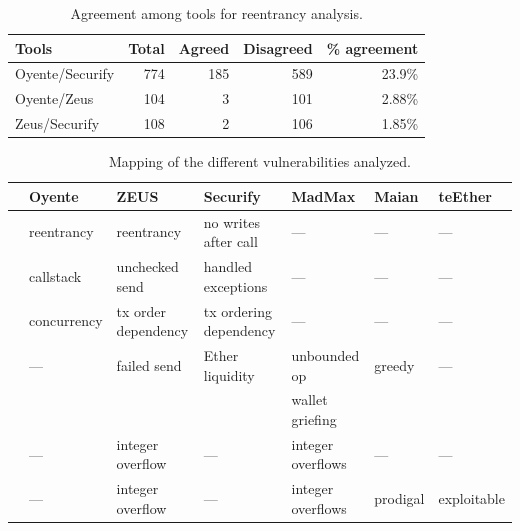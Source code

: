 \begin{table}[tb]
	\setlength{\tabcolsep}{2pt}
	\centering
	\caption{Agreement among tools for reentrancy analysis.}
	\label{fig:reentrancy-agreement}
	\begin{tabular}{lrrrr}
		\toprule
		\bf Tools       & \bf Total & \bf Agreed & \bf Disagreed & \bf \% agreement \\
		\midrule
		Oyente/Securify & 774       & 185        & 589           & 23.9\%           \\
		Oyente/Zeus     & 104       & 3          & 101           & 2.88\%           \\
		Zeus/Securify   & 108       & 2          & 106           & 1.85\%           \\
		\bottomrule
	\end{tabular}
\end{table}

\begin{table}
	\centering
	\setlength{\tabcolsep}{2pt}
	\small
	\caption{Mapping of the different vulnerabilities analyzed.}
	\label{fig:vuln-mapping}
	\begin{tabular}{lllllll}
		\toprule
		         & \bf Oyente  & \bf ZEUS            & \bf Securify           & \bf MadMax        & \bf Maian & \bf teEther \\
		\midrule
		\bf \vre & reentrancy  & reentrancy          & no writes after call   & ---               & ---       & ---         \\
		\hline
		\bf \vue & callstack   & unchecked send      & handled exceptions     & ---               & ---       & ---         \\
		\hline
		\bf \vto & concurrency & tx order dependency & tx ordering dependency & ---               & ---       & ---         \\
		\hline
		\bf \vle & ---         & failed send         & Ether liquidity        & unbounded op      & greedy    & ---         \\
		         &             &                     &                        & wallet griefing                             \\
		\hline
		\bf \vio & ---         & integer overflow    & ---                    & integer overflows & ---       & ---         \\
		\hline
		\bf \vua & ---         & integer overflow    & ---                    & integer overflows & prodigal  & exploitable \\
		\bottomrule
	\end{tabular}
\end{table}

